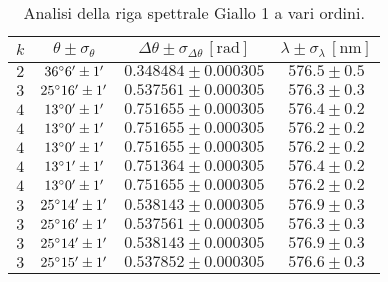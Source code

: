 \documentclass[]{article}
\begin{document}
    \begin{table}[H]
        \centering
        \begin{tabular}{||c|c|c|c||}
            \hline
            $k$ & $\theta \pm \sigma_{\theta}$ & $\Delta\theta \pm \sigma_{\Delta\theta} \, \left[\text{rad}\right]$ & $\lambda \pm \sigma_{\lambda} \, \left[\text{nm}\right]$ \\\hline
            \hline
            $2$ & $36\degree  6' \pm 1'$ & $0.348484 \pm 0.000305$ & $576.5 \pm 0.5$ \\\hline
            $3$ & $25\degree 16' \pm 1'$ & $0.537561 \pm 0.000305$ & $576.3 \pm 0.3$ \\\hline
            $4$ & $13\degree  0' \pm 1'$ & $0.751655 \pm 0.000305$ & $576.4 \pm 0.2$ \\\hline
            $4$ & $13\degree  0' \pm 1'$ & $0.751655 \pm 0.000305$ & $576.2 \pm 0.2$ \\\hline
            $4$ & $13\degree  0' \pm 1'$ & $0.751655 \pm 0.000305$ & $576.2 \pm 0.2$ \\\hline
            $4$ & $13\degree  1' \pm 1'$ & $0.751364 \pm 0.000305$ & $576.4 \pm 0.2$ \\\hline
            $4$ & $13\degree  0' \pm 1'$ & $0.751655 \pm 0.000305$ & $576.2 \pm 0.2$ \\\hline
            $3$ & $25\degree 14' \pm 1'$ & $0.538143 \pm 0.000305$ & $576.9 \pm 0.3$ \\\hline
            $3$ & $25\degree 16' \pm 1'$ & $0.537561 \pm 0.000305$ & $576.3 \pm 0.3$ \\\hline
            $3$ & $25\degree 14' \pm 1'$ & $0.538143 \pm 0.000305$ & $576.9 \pm 0.3$ \\\hline
            $3$ & $25\degree 15' \pm 1'$ & $0.537852 \pm 0.000305$ & $576.6 \pm 0.3$ \\\hline
        \end{tabular}
        \caption{Analisi della riga spettrale Giallo 1 a vari ordini.}
        \label{giallo-1}
    \end{table}
\end{document}
